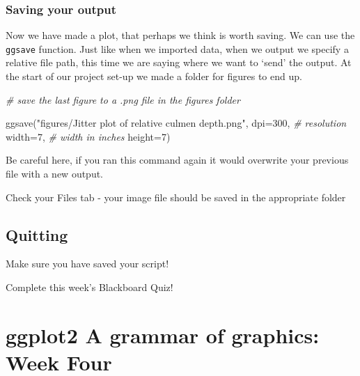 \documentclass[
]{book}
\makeatletter
\newenvironment{Shaded}{\begin{snugshade}}{\end{snugshade}}
\newcommand{\AttributeTok}[1]{\textcolor[rgb]{0.77,0.63,0.00}{#1}}
\newcommand{\CommentTok}[1]{\textcolor[rgb]{0.56,0.35,0.01}{\textit{#1}}}
\newcommand{\DecValTok}[1]{\textcolor[rgb]{0.00,0.00,0.81}{#1}}
\newcommand{\FunctionTok}[1]{\textcolor[rgb]{0.00,0.00,0.00}{#1}}
\newcommand{\NormalTok}[1]{#1}
\newcommand{\StringTok}[1]{\textcolor[rgb]{0.31,0.60,0.02}{#1}}
\newenvironment{kframe}{%
\medskip{}
\setlength{\fboxsep}{.8em}
 \def\at@end@of@kframe{}%
 \ifinner\ifhmode%
  \def\at@end@of@kframe{\end{minipage}}%
  \begin{minipage}{\columnwidth}%
 \fi\fi%
 \def\FrameCommand##1{\hskip\@totalleftmargin \hskip-\fboxsep
 \colorbox{shadecolor}{##1}\hskip-\fboxsep
     \hskip-\linewidth \hskip-\@totalleftmargin \hskip\columnwidth}%
 \MakeFramed {\advance\hsize-\width
   \@totalleftmargin\z@ \linewidth\hsize
   \@setminipage}}%
 {\par\unskip\endMakeFramed%
 \at@end@of@kframe}
\newenvironment{block}[1]
  {
  \begin{itemize}
  \renewcommand{\labelitemi}{
    \raisebox{-.7\height}[0pt][0pt]{
      {\setkeys{Gin}{width=3em,keepaspectratio}\texttt{[image: images/\#1]}}
    }
  }
  \setlength{\fboxsep}{1em}
  \begin{kframe}
  \item
  }
  {
  \end{kframe}
  \end{itemize}
  }
\newenvironment{rmdquestion}
  {\begin{block}{question}}
  {\end{block}}
\newenvironment{rmdwarning}
  {\begin{block}{warning}}
  {\end{block}}
\makeatother
\begin{document}
\hypertarget{saving-your-output}{%
\subsection{Saving your output}\label{saving-your-output}}

Now we have made a plot, that perhaps we think is worth saving. We can use the \texttt{ggsave} function.
Just like when we imported data, when we output we specify a relative file path, this time we are saying where we want to `send' the output. At the start of our project set-up we made a folder for figures to end up.

\begin{Shaded}
\begin{Highlighting}[]
\CommentTok{\# save the last figure to a .png file in the figures folder}

\FunctionTok{ggsave}\NormalTok{(}\StringTok{"figures/Jitter plot of relative culmen depth.png"}\NormalTok{, }
       \AttributeTok{dpi=}\DecValTok{300}\NormalTok{, }\CommentTok{\# resolution}
       \AttributeTok{width=}\DecValTok{7}\NormalTok{, }\CommentTok{\# width in inches}
       \AttributeTok{height=}\DecValTok{7}\NormalTok{)}
\end{Highlighting}
\end{Shaded}

\begin{rmdwarning}
Be careful here, if you ran this command again it would overwrite your
previous file with a new output.
\end{rmdwarning}

Check your Files tab - your image file should be saved in the appropriate folder

\hypertarget{quitting-2}{%
\section{Quitting}\label{quitting-2}}

\begin{rmdwarning}
Make sure you have saved your script!
\end{rmdwarning}

\begin{rmdquestion}
Complete this week's Blackboard Quiz!
\end{rmdquestion}

\hypertarget{ggplot2-a-grammar-of-graphics-week-four}{%
\chapter{ggplot2 A grammar of graphics: Week Four}\label{ggplot2-a-grammar-of-graphics-week-four}}
\end{document}

